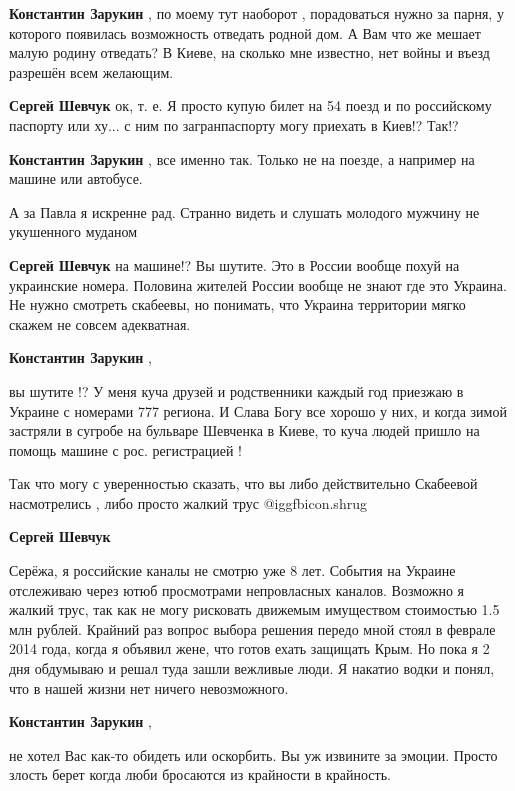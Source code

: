 \begin{itemize}
\begin{itemize}
\textbf{Константин Зарукин} , по моему тут наоборот , порадоваться нужно за парня, у которого появилась возможность отведать родной дом.
А Вам что же мешает малую родину отведать? В Киеве, на сколько мне известно, нет войны и въезд разрешён всем желающим.

\textbf{Сергей Шевчук} ок, т. е. Я просто купую билет на 54 поезд и по российскому паспорту или ху... с ним по загранпаспорту могу приехать в Киев!? Так!?

\textbf{Константин Зарукин} , все именно так. Только не на поезде, а например на машине или автобусе.

А за Павла я искренне рад. Странно видеть и слушать молодого мужчину не укушенного муданом

\textbf{Сергей Шевчук} на машине!? Вы шутите. Это в России вообще похуй на украинские номера. Половина жителей России вообще не знают где это Украина. Не нужно смотреть скабеевы, но понимать, что Украина территории мягко скажем не совсем адекватная.

\textbf{Константин Зарукин} , 

вы шутите !? У меня куча друзей и родственники каждый год приезжаю в Украине с
номерами 777 региона. И Слава Богу все хорошо у них, и когда зимой застряли в
сугробе на бульваре Шевченка в Киеве, то куча людей пришло на помощь машине с
рос. регистрацией !

Так что могу с уверенностью сказать, что вы либо действительно Скабеевой насмотрелись , либо просто жалкий трус  @igg{fbicon.shrug} 

\textbf{Сергей Шевчук} 

Серёжа, я российские каналы не смотрю уже 8 лет. События на Украине отслеживаю
через ютюб просмотрами непровласных каналов. Возможно я жалкий трус, так как не
могу рисковать движемым имуществом стоимостью 1.5 млн рублей. Крайний раз
вопрос выбора решения передо мной стоял в феврале 2014 года, когда я объявил
жене, что готов ехать защищать Крым. Но пока я 2 дня обдумываю и решал туда
зашли вежливые люди. Я накатио водки и понял, что в нашей жизни нет ничего
невозможного.

\textbf{Константин Зарукин} , 

не хотел Вас как-то обидеть или оскорбить. Вы уж извините за эмоции. Просто
злость берет когда люби бросаются из крайности в крайность.


\end{itemize}
\end{itemize}

